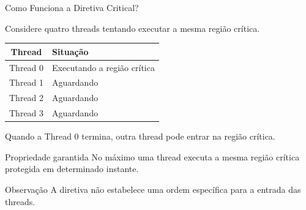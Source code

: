 \documentclass[aspectratio=169,11pt]{beamer}
\begin{document}
\begin{frame}{Como Funciona a Diretiva Critical?}

Considere quatro threads tentando executar
a mesma região crítica.

\vspace{0.3cm}

\begin{center}
\begin{tabular}{c|l}
\hline
\textbf{Thread} & \textbf{Situação} \\
\hline
Thread 0 & Executando a região crítica \\
Thread 1 & Aguardando \\
Thread 2 & Aguardando \\
Thread 3 & Aguardando \\
\hline
\end{tabular}
\end{center}

\vspace{0.4cm}

Quando a Thread 0 termina, outra thread
pode entrar na região crítica.

\vspace{0.3cm}

\begin{block}{Propriedade garantida}
No máximo uma thread executa a mesma
região crítica protegida em determinado instante.
\end{block}

\begin{alertblock}{Observação}
A diretiva não estabelece uma ordem específica
para a entrada das threads.
\end{alertblock}

\end{frame}


\end{document}
